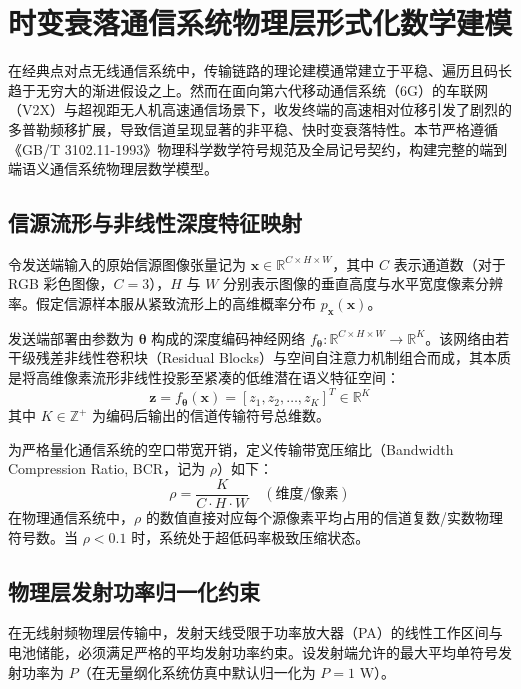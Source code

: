 \section{时变衰落通信系统物理层形式化数学建模}
\label{sec:3_1_system_model}

在经典点对点无线通信系统中，传输链路的理论建模通常建立于平稳、遍历且码长趋于无穷大的渐进假设之上。然而在面向第六代移动通信系统（6G）的车联网（V2X）与超视距无人机高速通信场景下，收发终端的高速相对位移引发了剧烈的多普勒频移扩展，导致信道呈现显著的非平稳、快时变衰落特性。本节严格遵循《GB/T 3102.11-1993》物理科学数学符号规范及全局记号契约，构建完整的端到端语义通信系统物理层数学模型。

\subsection{信源流形与非线性深度特征映射}
令发送端输入的原始信源图像张量记为 $\bm{x} \in \mathbb{R}^{C \times H \times W}$，其中 $C$ 表示通道数（对于 RGB 彩色图像，$C=3$），$H$ 与 $W$ 分别表示图像的垂直高度与水平宽度像素分辨率。假定信源样本服从紧致流形上的高维概率分布 $p_{\bm{x}}(\bm{x})$。

发送端部署由参数为 $\bm{\theta}$ 构成的深度编码神经网络 $f_{\bm{\theta}}: \mathbb{R}^{C \times H \times W} \to \mathbb{R}^K$。该网络由若干级残差非线性卷积块（Residual Blocks）与空间自注意力机制组合而成，其本质是将高维像素流形非线性投影至紧凑的低维潜在语义特征空间：
\begin{equation}
  \bm{z} = f_{\bm{\theta}}(\bm{x}) = [z_1, z_2, \dots, z_K]^T \in \mathbb{R}^K
  \label{eq:encoder_mapping_deep}
\end{equation}
其中 $K \in \mathbb{Z}^+$ 为编码后输出的信道传输符号总维数。

为严格量化通信系统的空口带宽开销，定义传输带宽压缩比（Bandwidth Compression Ratio, BCR，记为 $\rho$）如下：
\begin{equation}
  \rho = \frac{K}{C \cdot H \cdot W} \quad (\text{维度/像素})
  \label{eq:bandwidth_ratio}
\end{equation}
在物理通信系统中，$\rho$ 的数值直接对应每个源像素平均占用的信道复数/实数物理符号数。当 $\rho < 0.1$ 时，系统处于超低码率极致压缩状态。

\subsection{物理层发射功率归一化约束}
在无线射频物理层传输中，发射天线受限于功率放大器（PA）的线性工作区间与电池储能，必须满足严格的平均发射功率约束。设发射端允许的最大平均单符号发射功率为 $P$（在无量纲化系统仿真中默认归一化为 $P = 1\text{ W}$）。

